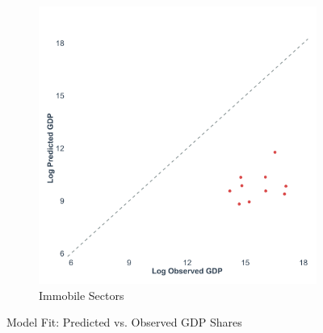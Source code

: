 \begin{figure}[H]
\begin{subfigure}{0.48\textwidth}
        \includegraphics[width=\textwidth]{code/figures/gdp_fit_immobile.png}
        \caption{Immobile Sectors}
        \label{fig:gdp_fit_immobile}
    \end{subfigure}
    \caption{Model Fit: Predicted vs. Observed GDP Shares}
    \label{fig:gdp_fit}
\end{figure}


